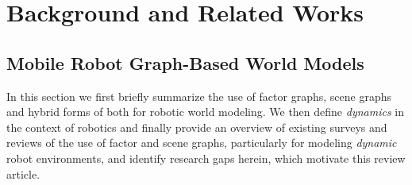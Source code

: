 \section{Background and Related Works}\label{sec:background}
\subsection{Mobile Robot Graph-Based World Models}\label{sec:background_graph_configurations}
In this section we first briefly summarize the use of factor graphs, scene graphs and hybrid forms of both for robotic world modeling. We then define \textit{dynamics} in the context of robotics and finally provide an overview of existing surveys and reviews of the use of factor and scene graphs, particularly for modeling \textit{dynamic} robot environments, and identify research gaps herein, which motivate this review article. 

